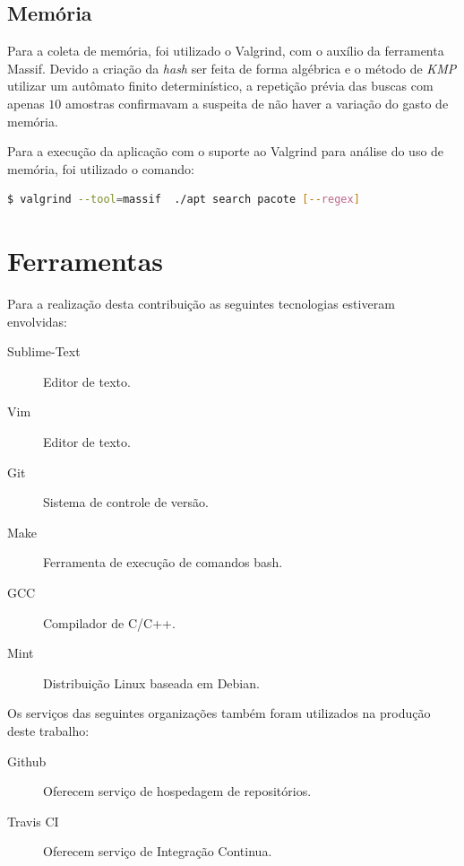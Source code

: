 \subsection*{Memória}

Para a coleta de memória, foi utilizado o {\code Valgrind}, com o auxílio da ferramenta {\code Massif}. Devido a criação da \textit{hash} ser feita de forma  algébrica e o método de \textit{KMP} utilizar um autômato finito determinístico, a repetição prévia das buscas com apenas $10$ amostras confirmavam a suspeita de não haver a variação do gasto de memória.

Para a execução da aplicação com o suporte ao {\code Valgrind} para análise do uso de memória, foi utilizado o comando:

\begin{lstlisting}[language=Bash,label=valgrind_call, numbers=none]
   $ valgrind --tool=massif  ./apt search pacote [--regex]
\end{lstlisting}


\section{Ferramentas}

Para a realização desta contribuição as seguintes tecnologias estiveram envolvidas:

\begin{description}
	\item[Sublime-Text] Editor de texto.
	\item[Vim] Editor de texto.
	\item[Git] Sistema de controle de versão.
	\item[Make] Ferramenta de execução de comandos {\code bash}.
	\item[GCC] Compilador de C/C++.
	\item[Mint] Distribuição Linux baseada em Debian.
\end{description}

Os serviços das seguintes organizações também foram utilizados na produção deste trabalho:

\begin{description}
	\item[Github] Oferecem serviço de hospedagem de repositórios.
	\item[Travis CI] Oferecem serviço de Integração Continua.
\end{description}

